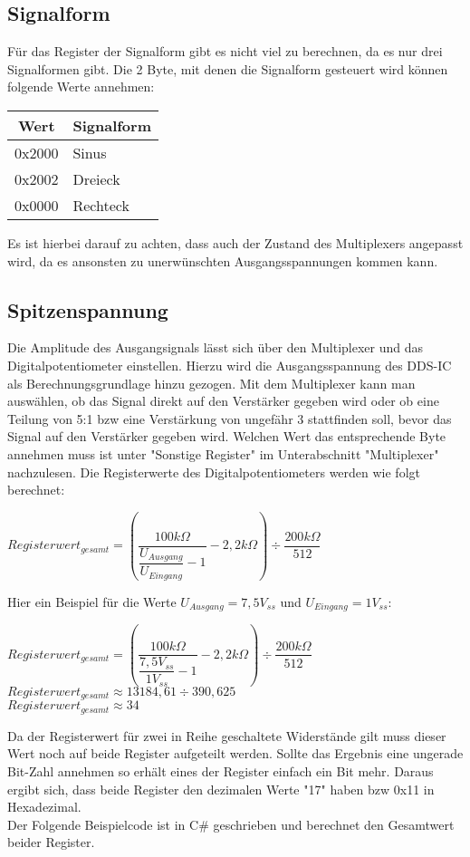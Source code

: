 \subsection{Signalform}
Für das Register der Signalform gibt es nicht viel zu berechnen, da es nur drei Signalformen gibt. Die 2 Byte, mit denen die Signalform gesteuert wird können folgende Werte annehmen:
\begin{center}
\begin{tabular}{c||l}
Wert & Signalform \\
\hline
\hline
0x2000 & Sinus \\
\hline
0x2002 & Dreieck \\
\hline
0x0000 & Rechteck \\
\end{tabular}
\end{center}
Es ist hierbei darauf zu achten, dass auch der Zustand des Multiplexers angepasst wird, da es ansonsten zu unerwünschten Ausgangsspannungen kommen kann.

\subsection{Spitzenspannung}
Die Amplitude des Ausgangsignals lässt sich über den Multiplexer und das Digitalpotentiometer einstellen. Hierzu wird die Ausgangsspannung des DDS-IC als Berechnungsgrundlage hinzu gezogen. Mit dem Multiplexer kann man auswählen, ob das Signal direkt auf den Verstärker gegeben wird oder ob eine Teilung von 5:1 bzw eine Verstärkung von ungefähr 3 stattfinden soll, bevor das Signal auf den Verstärker gegeben wird. Welchen Wert das entsprechende Byte annehmen muss ist unter "Sonstige Register" im Unterabschnitt "Multiplexer" nachzulesen. Die Registerwerte des Digitalpotentiometers werden wie folgt berechnet:\\

\begin{center}
$Registerwert_{gesamt} = (\dfrac{100k\Omega}{\dfrac{U_{Ausgang}}{U_{Eingang}}-1}-2,2k\Omega)\div \dfrac{200k\Omega}{512}$
\end{center}

Hier ein Beispiel für die Werte $U_{Ausgang}=7,5V_{ss}$ und $U_{Eingang}=1V_{ss}$:\\

\begin{center}
$Registerwert_{gesamt} = (\dfrac{100k\Omega}{\dfrac{7,5V_{ss}}{1V_{ss}}-1}-2,2k\Omega)\div \dfrac{200k\Omega}{512}$\\
\medskip
$Registerwert_{gesamt} \approx 13184,61\div 390,625$ \\
\medskip
$Registerwert_{gesamt} \approx 34$
\end{center}
Da der Registerwert für zwei in Reihe geschaltete Widerstände gilt muss dieser Wert noch auf beide Register aufgeteilt werden. Sollte das Ergebnis eine ungerade Bit-Zahl annehmen so erhält eines der Register einfach ein Bit mehr. Daraus ergibt sich, dass beide Register den dezimalen Werte "17" haben bzw 0x11 in Hexadezimal.\\
Der Folgende Beispielcode ist in C\# geschrieben und berechnet den Gesamtwert beider Register.

